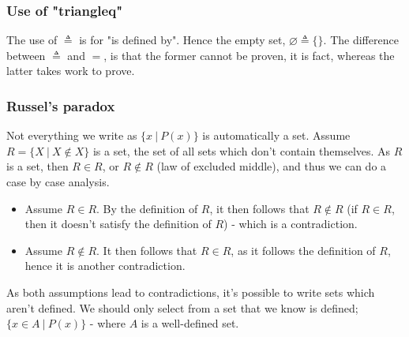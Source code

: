 \documentclass[a4paper, 12pt]{article}
\begin{document}
            \subsubsection*{Use of "triangleq"}
                The use of $\triangleq$ is for "is defined by". Hence the empty set, $\varnothing \triangleq \{\}$. The difference between $\triangleq$ and $=$, is that the former cannot be proven, it is fact, whereas the latter takes work to prove.
            \subsubsection*{Russel's paradox}
                Not everything we write as $\{x\ |\ P(x)\}$ is automatically a set. Assume $R = \{X\ |\ X \notin X\}$ is a set, the set of all sets which don't contain themselves. As $R$ is a set, then $R \in R$, or $R \notin R$ (law of excluded middle), and thus we can do a case by case analysis.
                \begin{itemize}
                    \item Assume $R \in R$. By the definition of $R$, it then follows that $R \notin R$ (if $R \in R$, then it doesn't satisfy the definition of $R$) - which is a contradiction.
                    \item Assume $R \notin R$. It then follows that $R \in R$, as it follows the definition of $R$, hence it is another contradiction.
                \end{itemize}
                As both assumptions lead to contradictions, it's possible to write sets which aren't defined. We should only select from a set that we know is defined; $\{x \in A\ |\ P(x)\}$ - where $A$ is a well-defined set.
\end{document}
